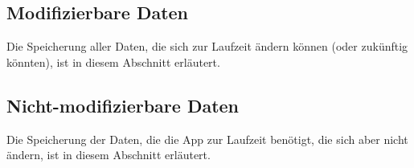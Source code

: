 \subsection{Modifizierbare Daten}
Die Speicherung aller Daten, die sich zur Laufzeit ändern können (oder zukünftig könnten), 
ist in diesem Abschnitt erläutert.


\subsection{Nicht-modifizierbare Daten}
Die Speicherung der Daten, die die App zur Laufzeit benötigt, die sich aber nicht ändern, 
ist in diesem Abschnitt erläutert.

